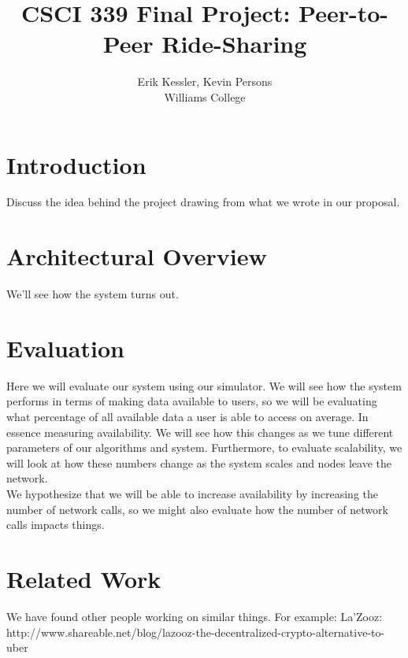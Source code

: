 \documentclass[letterpaper,11pt,twocolumn]{article}
\begin{document}
\title{CSCI 339 Final Project: Peer-to-Peer Ride-Sharing} 
\date{}

\author{
  {\rm Erik Kessler, Kevin Persons}\\
       Williams College\\
}

\maketitle

\thispagestyle{empty}
                                   
\begin{abstract}

\end{abstract}

\section{Introduction}
Discuss the idea behind the project drawing from what we wrote in our proposal.

\section{Architectural Overview}
We'll see how the system turns out.

\section{Evaluation}
Here we will evaluate our system using our simulator. We will see how the system performs in terms of making data available to users, so we will be evaluating what percentage of all available data a user is able to access on average. In essence measuring availability. We will see how this changes as we tune different parameters of our algorithms and system. Furthermore, to evaluate scalability, we will look at how these numbers change as the system scales and nodes leave the network. \\

We hypothesize that we will be able to increase availability by increasing the number of network calls, so we might also evaluate how the number of network calls impacts things.

\section{Related Work}
We have found other people working on similar things. For example:
La'Zooz: http://www.shareable.net/blog/lazooz-the-decentralized-crypto-alternative-to-uber
\end{document}
